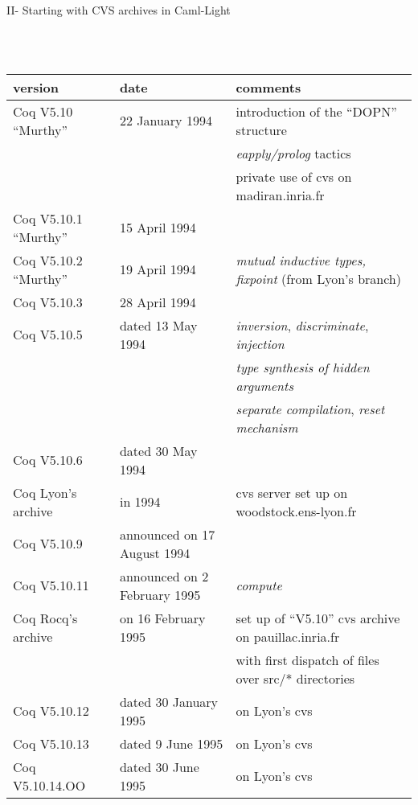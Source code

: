 \documentclass[a4paper]{book}
\newcommand{\feature}[1]{{\em #1}}
\begin{document}
\centerline{II- Starting with CVS archives in Caml-Light}
\mbox{}\\
\mbox{}\\
\begin{tabular}{l|l|l}
version & date & comments \\
\hline
Coq V5.10 ``Murthy'' & 22 January 1994 & 
introduction of the ``DOPN'' structure\\
 & & \feature{eapply/prolog} tactics\\
 & & private use of cvs on madiran.inria.fr\\

Coq V5.10.1 ``Murthy''& 15 April 1994 \\

Coq V5.10.2 ``Murthy''& 19 April 1994 & \feature{mutual inductive types, fixpoint} (from Lyon's branch)\\

Coq V5.10.3& 28 April 1994 \\

Coq V5.10.5& dated 13 May 1994 & \feature{inversion}, \feature{discriminate}, \feature{injection} \\
  & & \feature{type synthesis of hidden arguments}\\
  & & \feature{separate compilation}, \feature{reset mechanism} \\

Coq V5.10.6& dated 30 May 1994\\
Coq Lyon's archive & in 1994 & cvs server set up on woodstock.ens-lyon.fr\\

Coq V5.10.9& announced on 17 August 1994 &
 \\

Coq V5.10.11& announced on 2 February 1995 & \feature{compute}\\
Coq Rocq's archive & on 16 February 1995 & set up of ``V5.10'' cvs archive on pauillac.inria.fr \\
 & & with first dispatch of files over src/* directories\\

Coq V5.10.12& dated 30 January 1995 & on Lyon's cvs\\

Coq V5.10.13& dated 9 June 1995 & on Lyon's cvs\\

Coq V5.10.14.OO& dated 30 June 1995 & on Lyon's cvs\\


\end{tabular}
\end{document}
